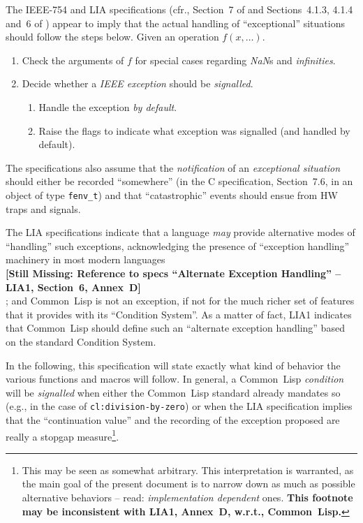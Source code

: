 \documentclass[10pt,fleqn]{article}
\newcommand{\CL}{\textsf{Common~Lisp}}
\newcommand{\CLang}{\textsf{C}}
\newcommand{\missingpart}[1]{{\ }\vspace{2mm}\\
{\textbf{[Still Missing: #1]}}\\
\vspace{2mm}}
\newcommand{\code}[1]{\texttt{#1}}
\newcommand{\clieeeterm}[1]{\textit{#1}}
\newcommand{\IEEEFPStd}{IEEE-754}
\begin{document}
The \IEEEFPStd{} and LIA specifications (cfr., Section~7 of
\cite{2008:IEEE-754} and Sections~4.1.3, 4.1.4 and~6 of
\cite{2012:LIA1}) appear to imply that the actual handling of
``exceptional'' situations should follow the steps below.  Given an
operation $f(x, \ldots)$.

\begin{enumerate}
\item Check the arguments of $f$ for special cases regarding
  \clieeeterm{NaN}s and \clieeeterm{infinities}.
\item Decide whether a \clieeeterm{IEEE exception} should be
  \emph{signalled}.
  \begin{enumerate}
  \item Handle the exception \emph{by default}.
  \item Raise the flags to indicate what exception was signalled (and
    handled by default).
  \end{enumerate}
\end{enumerate}

The specifications also assume that the \emph{notification} of an
\emph{exceptional situation} should either be recorded ``somewhere''
(in the \CLang{} specification, Section~7.6, in an object of type
\code{fenv\_t}) and that ``catastrophic'' events should ensue from HW
traps and signals.

The LIA specifications indicate that a language \emph{may} provide
alternative modes of ``handling'' such exceptions, acknowledging the
presence of ``exception handling'' machinery in most modern languages
\missingpart{Reference to specs ``Alternate Exception Handling'' --
  LIA1, Section~6, Annex~D};
and \CL{} is not an exception, if not for the much richer set of
features that it provides with its ``Condition System''.  As a matter
of fact, LIA1 indicates that \CL{} should define such an ``alternate
exception handling'' based on the standard Condition System.

In the following, this specification will state exactly what kind of
behavior the various functions and macros will follow.  In general, a
\CL{} \emph{condition} will be \emph{signalled} when either the \CL{}
standard already mandates so (e.g., in the case of
\code{cl:division-by-zero}) or when the LIA specification implies that
the ``continuation value'' and the recording of the exception proposed
are really a stopgap measure\footnote{This may be seen as somewhat
  arbitrary.  This interpretation is warranted, as the main goal of
  the present document is to narrow down as much as possible
  alternative behaviors -- read: \emph{implementation dependent}
  ones. \textbf{This footnote may be inconsistent with LIA1, Annex~D,
    w.r.t., \CL{}.}}.
\end{document}

